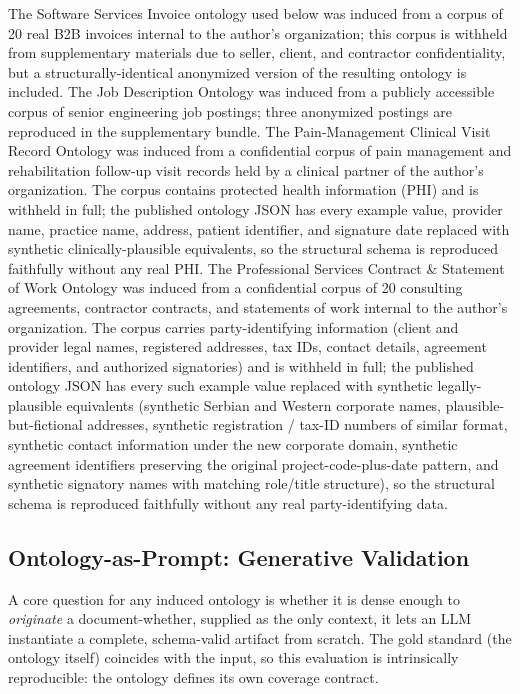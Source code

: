 \documentclass[runningheads,a4paper]{llncs}
\begin{document}
The Software Services Invoice ontology used below was induced from a
corpus of 20 real B2B invoices internal to the author's
organization; this corpus is withheld from supplementary materials due
to seller, client, and contractor confidentiality, but a
structurally-identical anonymized version of the resulting ontology is
included. The Job Description Ontology was induced from a
publicly accessible corpus of senior engineering job postings; three
anonymized postings are reproduced in the supplementary bundle.
The Pain-Management Clinical Visit Record Ontology was induced from a
confidential corpus of pain management and rehabilitation follow-up
visit records held by a clinical partner of the author's
organization. The corpus contains protected health information (PHI)
and is withheld in full; the published ontology JSON has every
example value, provider name, practice name, address, patient
identifier, and signature date replaced with synthetic
clinically-plausible equivalents, so the structural schema is
reproduced faithfully without any real PHI.
The Professional Services Contract \& Statement of Work Ontology was
induced from a confidential corpus of 20 consulting agreements,
contractor contracts, and statements of work internal to the author's
organization. The corpus carries party-identifying information
(client and provider legal names, registered addresses, tax IDs,
contact details, agreement identifiers, and authorized signatories)
and is withheld in full; the published ontology JSON has every such
example value replaced with synthetic legally-plausible equivalents
(synthetic Serbian and Western corporate names, plausible-but-fictional
addresses, synthetic registration / tax-ID numbers of similar
format, synthetic contact information under the new corporate domain,
synthetic agreement identifiers preserving the original
project-code-plus-date pattern, and synthetic signatory names with
matching role/title structure), so the structural schema is reproduced
faithfully without any real party-identifying data.

\subsection{Ontology-as-Prompt: Generative Validation}
\label{sec:ontology-as-prompt}

A core question for any induced ontology is whether it is dense enough
to \emph{originate} a document-whether, supplied as the only context,
it lets an LLM instantiate a complete, schema-valid artifact from
scratch. The gold standard (the ontology itself) coincides with the
input, so this evaluation is intrinsically reproducible: the ontology
defines its own coverage contract.
\end{document}
